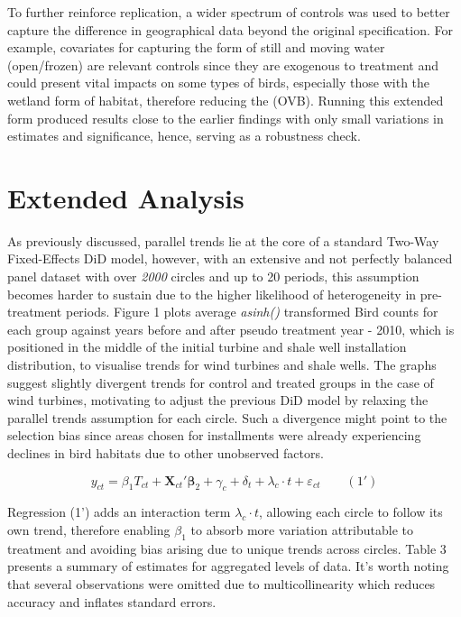 \documentclass{article}
\begin{document}
\addlinespace

To further reinforce replication, a wider spectrum of controls was used to better capture the difference in geographical data beyond the original specification. For example, covariates for capturing the form of still and moving water (open/frozen) are relevant controls since they are exogenous to treatment and could present vital impacts on some types of birds, especially those with the wetland form of habitat, therefore reducing the (OVB). Running this extended form produced results close to the earlier findings with only small variations in estimates and significance, hence, serving as a robustness check.

\section{Extended Analysis}

As previously discussed, parallel trends lie at the core of a standard Two-Way Fixed-Effects DiD model, however, with an extensive and not perfectly balanced panel dataset with over \textit{2000} circles and up to 20 periods, this assumption becomes harder to sustain due to the higher likelihood of heterogeneity in pre-treatment periods. Figure 1 plots average \textit{asinh()} transformed Bird counts for each group against years before and after pseudo treatment year - 2010, which is positioned in the middle of the initial turbine and shale well installation distribution, to visualise trends for wind turbines and shale wells. The graphs suggest slightly divergent trends for control and treated groups in the case of wind turbines, motivating to adjust the previous DiD model by relaxing the parallel trends assumption for each circle. Such a divergence might point to the selection bias since areas chosen for installments were already experiencing declines in bird habitats due to other unobserved factors. 

\addlinespace
\[
y_{ct} = \beta_1 T_{ct} + \mathbf{X}_{ct}' \boldsymbol{\beta}_2 + \gamma_c + \delta_t + \lambda_c \cdot t + \varepsilon_{ct} \hspace{2em} (1')
\]
\addlinespace

Regression (1') adds an interaction term \( \lambda_c \cdot t \), allowing each circle to follow its own trend, therefore enabling \( \beta_1 \) to absorb more variation attributable to treatment and avoiding bias arising due to unique trends across circles. Table 3 presents a summary of estimates for aggregated levels of data. It's worth noting that several observations were omitted due to multicollinearity which reduces accuracy and inflates standard errors.
\end{document}
